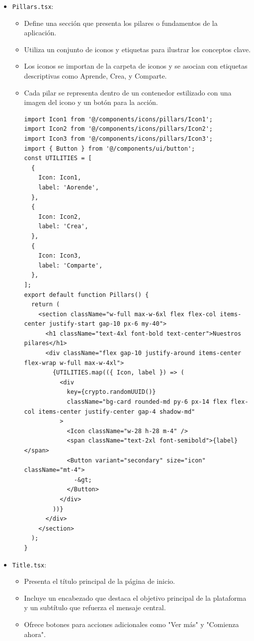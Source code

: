   \begin{itemize}
    \item \texttt{Pillars.tsx}:
    \begin{itemize}
      \item Define una sección que presenta los pilares o fundamentos de la aplicación. 
      \item Utiliza un conjunto de iconos y etiquetas para ilustrar los conceptos clave.
      \item Los iconos se importan de la carpeta de iconos y se asocian con etiquetas descriptivas como Aprende, Crea, y Comparte.
      \item Cada pilar se representa dentro de un contenedor estilizado con una imagen del icono y un botón para la acción.
      \begin{verbatim}
import Icon1 from '@/components/icons/pillars/Icon1';
import Icon2 from '@/components/icons/pillars/Icon2';
import Icon3 from '@/components/icons/pillars/Icon3';
import { Button } from '@/components/ui/button';
const UTILITIES = [
  {
    Icon: Icon1,
    label: 'Aorende',
  },
  {
    Icon: Icon2,
    label: 'Crea',
  },
  {
    Icon: Icon3,
    label: 'Comparte',
  },
];
export default function Pillars() {
  return (
    <section className="w-full max-w-6xl flex flex-col items-center justify-start gap-10 px-6 my-40">
      <h1 className="text-4xl font-bold text-center">Nuestros pilares</h1>
      <div className="flex gap-10 justify-around items-center flex-wrap w-full max-w-4xl">
        {UTILITIES.map(({ Icon, label }) => (
          <div
            key={crypto.randomUUID()}
            className="bg-card rounded-md py-6 px-14 flex flex-col items-center justify-center gap-4 shadow-md"
          >
            <Icon className="w-28 h-28 m-4" />
            <span className="text-2xl font-semibold">{label}</span>
            <Button variant="secondary" size="icon" className="mt-4">
              -&gt;
            </Button>
          </div>
        ))}
      </div>
    </section>
  );
}
      \end{verbatim}
    \end{itemize}
    \item \texttt{Title.tsx}:
    \begin{itemize}
      \item Presenta el título principal de la página de inicio.
      \item Incluye un encabezado que destaca el objetivo principal de la plataforma y un subtítulo que refuerza el mensaje central.
      \item Ofrece botones para acciones adicionales como "Ver más" y "Comienza ahora".

\end{itemize}
\end{itemize}
